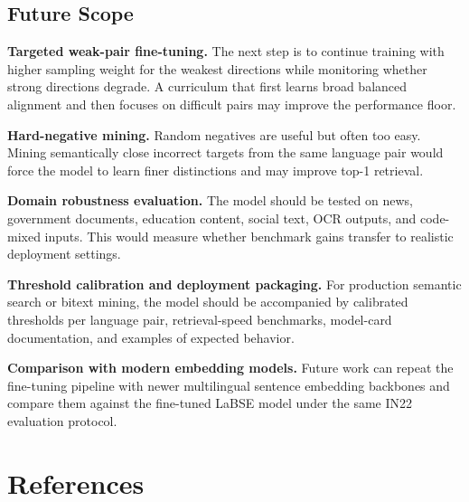 \documentclass[12pt, a4paper]{article}
\begin{document}
\subsection{Future Scope}

\textbf{Targeted weak-pair fine-tuning.}
The next step is to continue training with higher sampling weight for the weakest directions while monitoring whether strong directions degrade. A curriculum that first learns broad balanced alignment and then focuses on difficult pairs may improve the performance floor.

\textbf{Hard-negative mining.}
Random negatives are useful but often too easy. Mining semantically close incorrect targets from the same language pair would force the model to learn finer distinctions and may improve top-1 retrieval.

\textbf{Domain robustness evaluation.}
The model should be tested on news, government documents, education content, social text, OCR outputs, and code-mixed inputs. This would measure whether benchmark gains transfer to realistic deployment settings.

\textbf{Threshold calibration and deployment packaging.}
For production semantic search or bitext mining, the model should be accompanied by calibrated thresholds per language pair, retrieval-speed benchmarks, model-card documentation, and examples of expected behavior.

\textbf{Comparison with modern embedding models.}
Future work can repeat the fine-tuning pipeline with newer multilingual sentence embedding backbones and compare them against the fine-tuned LaBSE model under the same IN22 evaluation protocol.

\newpage

\section*{References}
\end{document}
